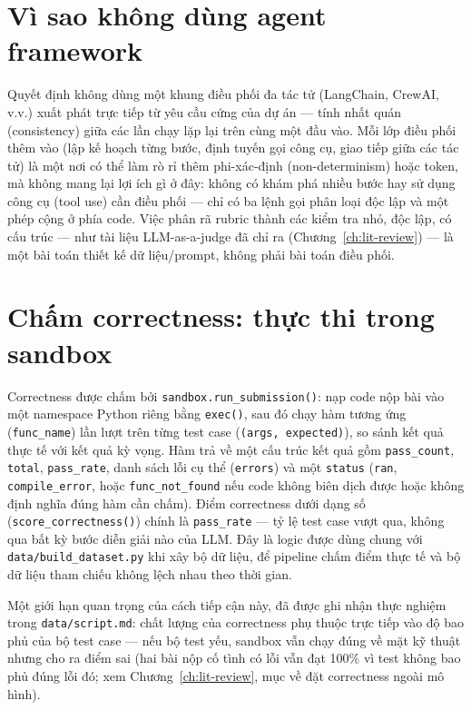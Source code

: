 \documentclass[a4paper,12pt]{report}
\begin{document}
\section{Vì sao không dùng agent framework}

Quyết định không dùng một khung điều phối đa tác tử (LangChain, CrewAI,
v.v.) xuất phát trực tiếp từ yêu cầu cứng của dự án — tính nhất quán
(consistency) giữa các lần chạy lặp lại trên cùng một đầu vào. Mỗi lớp điều
phối thêm vào (lập kế hoạch từng bước, định tuyến gọi công cụ, giao tiếp
giữa các tác tử) là một nơi có thể làm rò rỉ thêm phi-xác-định
(non-determinism) hoặc token, mà không mang lại lợi ích gì ở đây: không có
khám phá nhiều bước hay sử dụng công cụ (tool use) cần điều phối — chỉ có
ba lệnh gọi phân loại độc lập và một phép cộng ở phía code. Việc phân rã
rubric thành các kiểm tra nhỏ, độc lập, có cấu trúc — như tài liệu
LLM-as-a-judge đã chỉ ra (Chương~\ref{ch:lit-review}) — là một bài toán
thiết kế dữ liệu/prompt, không phải bài toán điều phối.

\section{Chấm correctness: thực thi trong sandbox}

Correctness được chấm bởi \texttt{sandbox.run\_submission()}: nạp code nộp
bài vào một namespace Python riêng bằng \texttt{exec()}, sau đó chạy hàm
tương ứng (\texttt{func\_name}) lần lượt trên từng test case
(\texttt{(args, expected)}), so sánh kết quả thực tế với kết quả kỳ vọng.
Hàm trả về một cấu trúc kết quả gồm \texttt{pass\_count}, \texttt{total},
\texttt{pass\_rate}, danh sách lỗi cụ thể (\texttt{errors}) và một
\texttt{status} (\texttt{ran}, \texttt{compile\_error}, hoặc
\texttt{func\_not\_found} nếu code không biên dịch được hoặc không định
nghĩa đúng hàm cần chấm). Điểm correctness dưới dạng số
(\texttt{score\_correctness()}) chính là \texttt{pass\_rate} — tỷ lệ test
case vượt qua, không qua bất kỳ bước diễn giải nào của LLM. Đây là logic
được dùng chung với \texttt{data/build\_dataset.py} khi xây bộ dữ liệu, để
pipeline chấm điểm thực tế và bộ dữ liệu tham chiếu không lệch nhau theo
thời gian.

Một giới hạn quan trọng của cách tiếp cận này, đã được ghi nhận thực nghiệm
trong \texttt{data/script.md}: chất lượng của correctness phụ thuộc trực
tiếp vào độ bao phủ của bộ test case — nếu bộ test yếu, sandbox vẫn chạy
đúng về mặt kỹ thuật nhưng cho ra điểm sai (hai bài nộp cố tình có lỗi vẫn
đạt 100\% vì test không bao phủ đúng lỗi đó; xem
Chương~\ref{ch:lit-review}, mục về đặt correctness ngoài mô hình).
\end{document}
